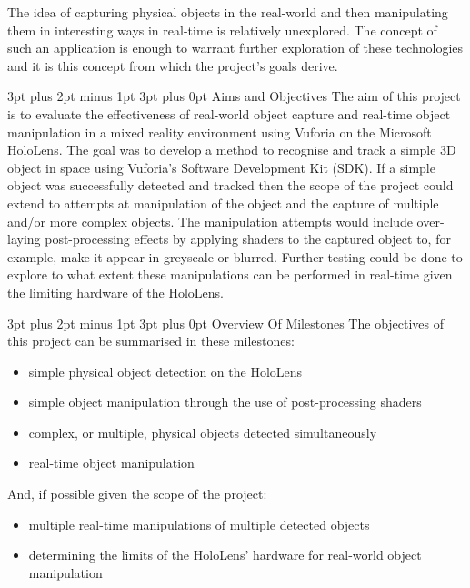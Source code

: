 \documentclass[12pt,a4paper,oneside]{article}
\makeatletter
\renewcommand\subsubsection{\@startsection {subsubsection}{1}{0mm} %
	                           {3pt plus 2pt minus 1pt} %
	                           {3pt plus 0pt} %
	                           {\normalfont\bfseries}}
\renewcommand\subsection{\@startsection {subsection}{1}{0mm} %
                               {3pt plus 2pt minus 1pt} %
                               {3pt plus 0pt} %
                               {\large\bfseries}}
\makeatother
\begin{document}
The idea of capturing physical objects in the real-world and then manipulating them in interesting ways in real-time is relatively unexplored. The concept of such an application is enough to warrant further exploration of these technologies and it is this concept from which the project's goals derive.

\subsection{Aims and Objectives}
The aim of this project is to evaluate the effectiveness of real-world object capture and real-time object manipulation in a mixed reality environment using Vuforia on the Microsoft HoloLens. The goal was to develop a method to recognise and track a simple 3D object in space using Vuforia's Software Development Kit (SDK). If a simple object was successfully detected and tracked then the scope of the project could extend to attempts at manipulation of the object and the capture of multiple and/or more complex objects. The manipulation attempts would include over-laying post-processing effects by applying shaders to the captured object to, for example, make it appear in greyscale or blurred. Further testing could be done to explore to what extent these manipulations can be performed in real-time given the limiting hardware of the HoloLens.

\subsubsection{Overview Of Milestones}
The objectives of this project can be summarised in these milestones:
\begin{itemize}\itemsep0pt
	\item simple physical object detection on the HoloLens
	\item simple object manipulation through the use of post-processing shaders
	\item complex, or multiple, physical objects detected simultaneously
	\item real-time object manipulation
\end{itemize}
And, if possible given the scope of the project:
\begin{itemize}\itemsep0pt
	\item multiple real-time manipulations of multiple detected objects
	\item determining the limits of the HoloLens' hardware for real-world object manipulation
\end{itemize}
\end{document}
